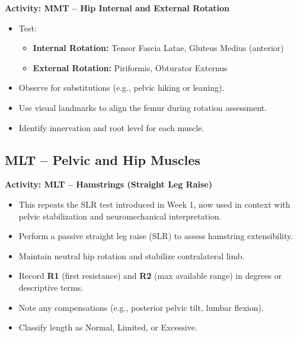 \begin{labactivitybox}
\textbf{Activity: MMT – Hip Internal and External Rotation}

\begin{itemize}
  \item Test:
  \begin{itemize}
    \item \textbf{Internal Rotation:} Tensor Fascia Latae, Gluteus Medius (anterior)
    \item \textbf{External Rotation:} Piriformis, Obturator Externus
  \end{itemize}
  \item Observe for substitutions (e.g., pelvic hiking or leaning).
  \item Use visual landmarks to align the femur during rotation assessment.
  \item Identify innervation and root level for each muscle.
\end{itemize}
\end{labactivitybox}

\subsection*{MLT – Pelvic and Hip Muscles}

\begin{labactivitybox}
\textbf{Activity: MLT – Hamstrings (Straight Leg Raise)}

\begin{itemize}
  \item This repeats the SLR test introduced in Week 1, now used in context with pelvic stabilization and neuromechanical interpretation.
  \item Perform a passive straight leg raise (SLR) to assess hamstring extensibility.
  \item Maintain neutral hip rotation and stabilize contralateral limb.
  \item Record \textbf{R1} (first resistance) and \textbf{R2} (max available range) in degrees or descriptive terms.
  \item Note any compensations (e.g., posterior pelvic tilt, lumbar flexion).
  \item Classify length as Normal, Limited, or Excessive.
\end{itemize}
\end{labactivitybox}

